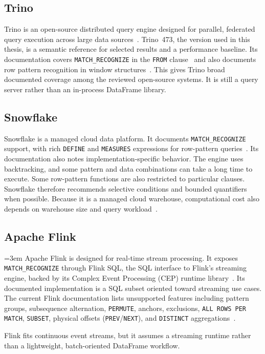 \subsection{Trino}
\label{subsec:related-trino}

Trino is an open-source distributed query engine designed for
parallel, federated query execution across large data
sources~\cite{trino2022,trino2021row}.  Trino~473, the version used in
this thesis, is a semantic reference for selected results and a
performance baseline.  Its documentation covers
\texttt{MATCH\_RECOGNIZE} in the \texttt{FROM}
clause~\cite{trino2022} and also documents row pattern recognition in
window structures~\cite{TrinoDocumentation}.  This gives Trino broad
documented coverage among the reviewed open-source systems.  It is
still a query server rather than an in-process DataFrame library.

\subsection{Snowflake}
\label{subsec:related-snowflake}

Snowflake is a managed cloud data platform.  It documents
\texttt{MATCH\_RECOGNIZE} support, with rich \texttt{DEFINE} and
\texttt{MEASURES} expressions for row-pattern
queries~\cite{snowflake2025match_recognize,hoffa2021snowflake}.
Its documentation also notes implementation-specific behavior.  The
engine uses backtracking, and some pattern and data combinations can
take a long time to execute.  Some row-pattern functions are also
restricted to particular clauses.  Snowflake therefore recommends
selective conditions and bounded quantifiers when possible.  Because
it is a managed cloud warehouse, computational cost also depends on
warehouse size and query workload~\cite{snowflake2025match_recognize}.

\subsection{Apache Flink}
\label{subsec:related-flink}

\begingroup\emergencystretch=3em
Apache Flink is designed for real-time stream processing.  It exposes
\texttt{MATCH\_RECOGNIZE} through Flink SQL, the SQL interface to
Flink's streaming engine, backed by its Complex
Event Processing (CEP) runtime
library~\cite{flink,vsprem2024building,georgiou2025streaming}.
Its documented implementation is a SQL subset oriented toward
streaming use cases.  The current Flink documentation lists unsupported
features including pattern groups, subsequence alternation,
\texttt{PERMUTE}, anchors, exclusions, \texttt{ALL ROWS PER MATCH},
\texttt{SUBSET}, physical offsets (\texttt{PREV}/\texttt{NEXT}), and
\texttt{DISTINCT} aggregations~\cite{flink}.\par\endgroup  Flink fits continuous event streams, but it
assumes a streaming runtime rather than a lightweight, batch-oriented
DataFrame workflow.

